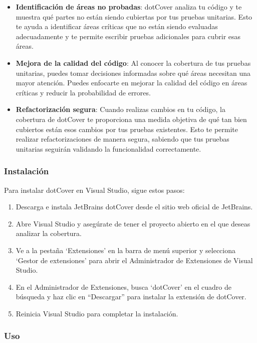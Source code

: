 \documentclass[executivepaper]{article}
\begin{document}
\begin{itemize}
  \item \textbf{Identificación de áreas no probadas}: dotCover analiza tu código y te muestra qué partes no están siendo cubiertas por tus pruebas unitarias. Esto te ayuda a identificar áreas críticas que no están siendo evaluadas adecuadamente y te permite escribir pruebas adicionales para cubrir esas áreas.
  \item \textbf{Mejora de la calidad del código}: Al conocer la cobertura de tus pruebas unitarias, puedes tomar decisiones informadas sobre qué áreas necesitan una mayor atención. Puedes enfocarte en mejorar la calidad del código en áreas críticas y reducir la probabilidad de errores.
  \item \textbf{Refactorización segura}: Cuando realizas cambios en tu código, la cobertura de dotCover te proporciona una medida objetiva de qué tan bien cubiertos están esos cambios por tus pruebas existentes. Esto te permite realizar refactorizaciones de manera segura, sabiendo que tus pruebas unitarias seguirán validando la funcionalidad correctamente.
\end{itemize}

\subsubsection*{Instalación}

Para instalar dotCover en Visual Studio, sigue estos pasos:

\begin{enumerate}
  \item Descarga e instala JetBrains dotCover desde el sitio web oficial de JetBrains.
  \item Abre Visual Studio y asegúrate de tener el proyecto abierto en el que deseas analizar la cobertura.
  \item Ve a la pestaña \enquote*{Extensiones} en la barra de menú superior y selecciona \enquote*{Gestor de extensiones} para abrir el Administrador de Extensiones de Visual Studio.
  \item En el Administrador de Extensiones, busca \enquote*{dotCover} en el cuadro de búsqueda y haz clic en \enquote{Descargar} para instalar la extensión de dotCover.
  \item Reinicia Visual Studio para completar la instalación.
\end{enumerate}

\subsubsection*{Uso}
\end{document}
